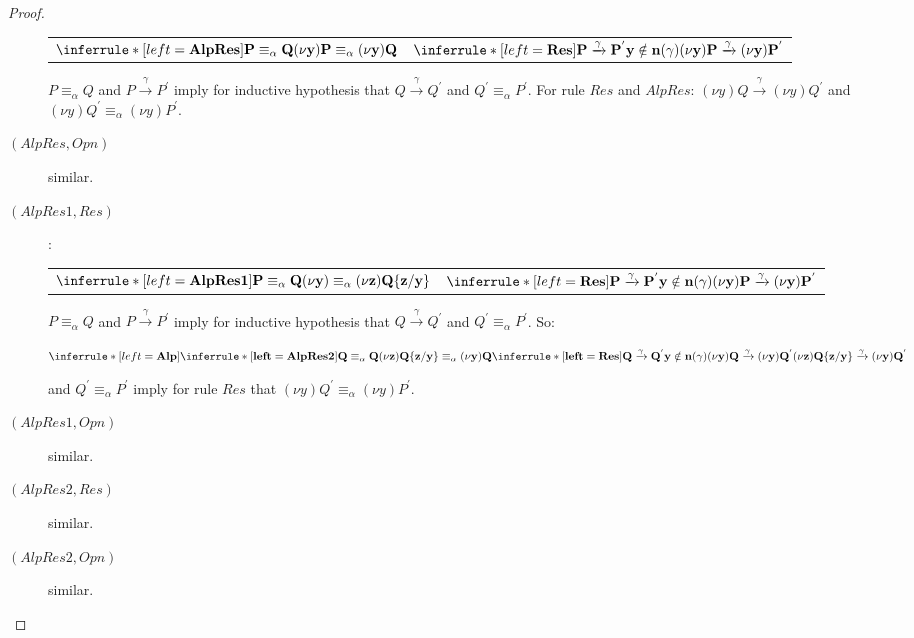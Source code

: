 \begin{proposition}
\begin{proof}
\begin{description}
	\begin{center}
	  \begin{tabular}{ll}
	      $\inferrule* [left=\bf{AlpRes}]{
		P \equiv_{\alpha} Q
	      }{
		(\nu y)P \equiv_{\alpha} (\nu y)Q
	      }$
	    &
	      $\inferrule* [left=\bf{Res}]{
		  P \xrightarrow{\gamma} P^{'}
		\\
		  y\notin n(\gamma)
	      }{
		(\nu y)P \xrightarrow{\gamma} (\nu y)P^{'}
	      }$	      
	  \end{tabular}
	\end{center}
	$P \equiv_{\alpha} Q$ and $P \xrightarrow{\gamma} P^{'}$ imply for inductive hypothesis that $Q \xrightarrow{\gamma} Q^{'}$ and $Q^{'}\equiv_{\alpha} P^{'}$. For rule $Res$ and $AlpRes$: $(\nu y)Q \xrightarrow{\gamma} (\nu y)Q^{'}$ and $(\nu y)Q^{'} \equiv_{\alpha} (\nu y)P^{'}$.
      \item[$(AlpRes, Opn)$] similar.
      \item[$(AlpRes1, Res)$]:
	\begin{center}
	  \begin{tabular}{ll}
	      $\inferrule* [left=\bf{AlpRes1}]{
		P \equiv_{\alpha} Q
	      }{
		(\nu y) \equiv_{\alpha} (\nu z)Q\{z/y\}
	      }$
	    &
	      $\inferrule* [left=\bf{Res}]{
		  P \xrightarrow{\gamma} P^{'}
		\\
		  y\notin n(\gamma)
	      }{
		(\nu y)P \xrightarrow{\gamma} (\nu y)P^{'}
	      }$	      
	  \end{tabular}
	\end{center}
	$P \equiv_{\alpha} Q$ and $P \xrightarrow{\gamma} P^{'}$ imply for inductive hypothesis that $Q \xrightarrow{\gamma} Q^{'}$ and $Q^{'}\equiv_{\alpha} P^{'}$. So:
	\begin{center}
	  $\inferrule* [left=\bf{Alp}]{
	      \inferrule* [left=\bf{AlpRes2}]{
		Q \equiv_{\alpha} Q
	      }{
		(\nu z)Q\{z/y\} \equiv_{\alpha} (\nu y)Q
	      }
	    \\
	      \inferrule* [left=\bf{Res}]{
		  Q \xrightarrow{\gamma} Q^{'}
		\\
		  y\notin n(\gamma)
	      }{
		(\nu y)Q \xrightarrow{\gamma} (\nu y)Q^{'}
	      }
	  }{
	    (\nu z)Q\{z/y\} \xrightarrow{\gamma} (\nu y)Q^{'}
	  }$
	\end{center}
	and $Q^{'}\equiv_{\alpha} P^{'}$ imply for rule $Res$ that $(\nu y)Q^{'} \equiv_{\alpha} (\nu y)P^{'}$.
      \item[$(AlpRes1, Opn)$] similar.
      \item[$(AlpRes2, Res)$] similar.
      \item[$(AlpRes2, Opn)$] similar.
    \end{description}
  \end{proof}
\end{proposition}


